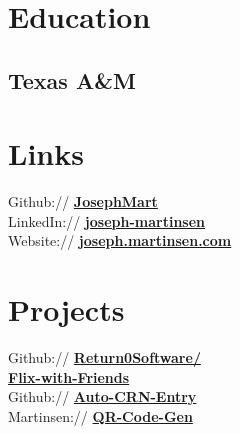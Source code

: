 \documentclass[letterpaper]{deedy-resume} %
\begin{document}
\begin{minipage}[t]{0.33\textwidth} %


\section{Education} 

\subsection{Texas A\&M}


\sectionspace %


\section{Links} 

Github:// \href{https://github.com/JosephMart}{\bf JosephMart} \\
LinkedIn:// \href{https://www.linkedin.com/in/joseph-martinsen}{\bf joseph-martinsen} \\
Website:// \href{http://joseph.martinsen.com}{\bf joseph.martinsen.com} \\
\sectionspace %

\section{Projects} 

Github:// \href{https://github.com/Return0Software/Flix-with-Friends}{\bf Return0Software/ \\ \hspace{41pt}Flix-with-Friends} \\
Github:// \href{https://github.com/JosephMart/Auto-CRN-Entry}{\bf Auto-CRN-Entry} \\
Martinsen:// \href{http://qr.martinsen.com}{\bf QR-Code-Gen}
\sectionspace %


\end{minipage}
\end{document}
